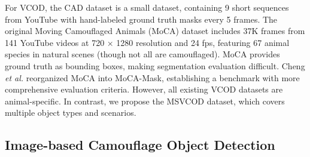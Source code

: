 For VCOD, the CAD dataset \cite{bideau2016s} is a small dataset, containing 9 short sequences from YouTube with hand-labeled ground truth masks every 5 frames. The original Moving Camouflaged Animals (MoCA) dataset \cite{lamdouar2020betrayed} includes 37K frames from 141 YouTube videos at 720 × 1280 resolution and 24 fps, featuring 67 animal species in natural scenes (though not all are camouflaged). MoCA provides ground truth as bounding boxes, making segmentation evaluation difficult. Cheng \emph {et al.} \cite{cheng2022implicit} reorganized MoCA into MoCA-Mask, establishing a benchmark with more comprehensive evaluation criteria. However, all existing VCOD datasets are animal-specific. In contrast, we propose the MSVCOD dataset, which covers multiple object types and scenarios.



\subsection{Image-based Camouflage Object Detection}




